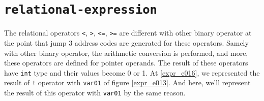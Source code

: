 \section{\tt{relational-expression}}
\label{expr_e020}

The relational operators {\tt{<}}, {\tt{>}}, {\tt{<=}}, {\tt{>=}}
are different with other binary operator at the point that
jump 3 address codes are generated for these operators.
Samely with other binary operator, the arithmetic conversion is
performed, and more, these operators are defined for pointer operands.
The result of these operators have {\tt{int}} type and their values
become 0 or 1. At \ref{expr_e016}, we represented the result of
{\tt{!}} operator with {\tt{var01}} of figure \ref{expr_e013}.
And here, we'll represent the result of this operator with {\tt{var01}}
by the same reason.

